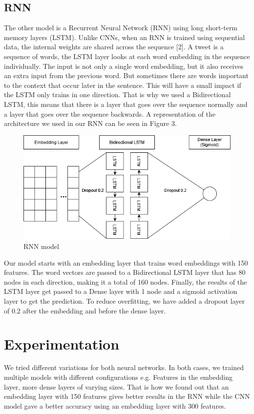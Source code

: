 \documentclass{article}
\begin{document}
\subsection{RNN}
The other model is a Recurrent Neural Network (RNN) using long short-term memory
layers (LSTM). Unlike CNNs, when an RNN is trained using sequential data, the
internal weights are shared across the sequence [2]. A tweet is a sequence of
words, the LSTM layer looks at each word embedding in the sequence individually.
The input is not only a single word embedding, but it also receives an extra
input from the previous word. But sometimes there are words important to the
context that occur later in the sentence. This will have a small impact if the
LSTM only trains in one direction. That is why we used a Bidirectional LSTM,
this means that there is a layer that goes over the sequence normally and a
layer that goes over the sequence backwards. A representation of the
architecture we used in our RNN can be seen in Figure 3.
\begin{figure}[H]
  \centering
  \includegraphics[scale=0.54]{RNN.png}
  \caption{RNN model}
\end{figure}
Our model starts with an embedding layer that trains word embeddings with 150
features. The word vectors are passed to a Bidirectional LSTM layer that has 80
nodes in each direction, making it a total of 160 nodes. Finally, the results of
the LSTM layer get passed to a Dense layer with 1 node and a sigmoid activation
layer to get the prediction. To reduce overfitting, we have added a dropout
layer of 0.2 after the embedding and before the dense layer.
\section{Experimentation}
We tried different variations for both neural networks. In both cases, we
trained multiple models with different configurations e.g. Features in the
embedding layer, more dense layers of varying sizes. That is how we found out
that an embedding layer with 150 features gives better results in the RNN while
the CNN model gave a better accuracy using an embedding layer with 300 features.
\end{document}
